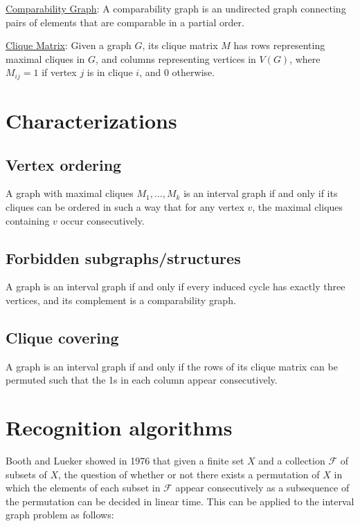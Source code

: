 \documentclass[11pt]{article}
\begin{document}
\noindent
\underline{Comparability Graph}: A comparability graph is an undirected graph connecting pairs of elements that are comparable in a partial order.

\noindent
\underline{Clique Matrix}: Given a graph $G$, its clique matrix $M$ has rows representing maximal cliques in $G$, and columns representing vertices in $V(G)$, where $M_{ij}=1$ if vertex $j$ is in clique $i$, and 0 otherwise.


\section{Characterizations}

\subsection{Vertex ordering}

A graph with maximal cliques $M_1,\ldots,M_k$ is an interval graph if and only if its cliques can be ordered in such a way that for any vertex $v$, the maximal cliques containing $v$ occur consecutively. \cite{Golumbic}


\subsection{Forbidden subgraphs/structures}

A graph is an interval graph if and only if every induced cycle has exactly three vertices, and its complement is a comparability graph. \cite{West}


\subsection{Clique covering}

A graph is an interval graph if and only if the rows of its clique matrix can be permuted such that the 1s in each column appear consecutively. \cite{Fulkerson}


\section{Recognition algorithms}

Booth and Lueker \cite{Booth} showed in 1976 that given a finite set $X$ and a collection $\mathcal{F}$ of subsets of $X$, the question of whether or not there exists a permutation of $X$ in which the elements of each subset in $\mathcal{F}$ appear consecutively as a subsequence of the permutation can be decided in linear time.
This can be applied to the interval graph problem as follows:
\end{document}
